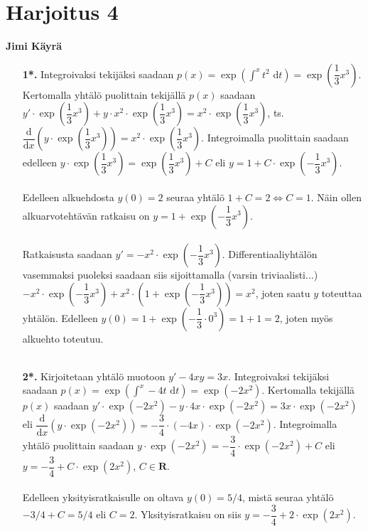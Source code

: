 \documentclass[12pt,fleqn]{article}
\begin{document}
\section*{Harjoitus 4}
\textbf{Jimi Käyrä}\\
\begin{enumerate}[label=\textbf{\arabic*.}]
\item [\textbf{1*.}] Integroivaksi tekijäksi saadaan \(p(x)=\exp \left (\int^x t^2\text{ d}t\right )=\exp \left (\dfrac{1}{3}x^3\right )\). Kertomalla yhtälö puolittain tekijällä \(p(x)\) saadaan \(y'\cdot \exp\left (\dfrac{1}{3}x^3 \right )+y\cdot x^2\cdot \exp \left (\dfrac{1}{3}x^3\right )=x^2\cdot \exp \left (\dfrac{1}{3}x^3\right )\), ts. \(\dfrac{\text{d}}{\text{d}x}\left (y\cdot \exp \left (\dfrac{1}{3}x^3\right )\right )=x^2\cdot \exp \left (\dfrac{1}{3}x^3\right )\). Integroimalla puolittain saadaan edelleen \(y\cdot \exp \left (\dfrac{1}{3}x^3\right )=\exp\left (\dfrac{1}{3}x^3\right )+C\) eli \(y=1+C\cdot \exp\left (-\dfrac{1}{3}x^3\right )\).\\
 \\
Edelleen alkuehdosta \(y(0)=2\) seuraa yhtälö \(1+C=2\iff C=1\). Näin ollen alkuarvotehtävän ratkaisu on \(y=1+\exp \left (-\dfrac{1}{3}x^3\right )\).\\
 \\
Ratkaisusta saadaan \(y'=-x^2\cdot \exp \left (-\dfrac{1}{3}x^3\right )\). Differentiaaliyhtälön vasemmaksi puoleksi saadaan siis sijoittamalla (varsin triviaalisti...) \(-x^2\cdot \exp \left (-\dfrac{1}{3}x^3\right )+x^2\cdot \left (1+\exp \left (-\dfrac{1}{3}x^3\right )\right )=x^2\), joten saatu \(y\) toteuttaa yhtälön. Edelleen \(y(0)=1+\exp \left (-\dfrac{1}{3}\cdot 0^3\right )=1+1=2\), joten myös alkuehto toteutuu.\\
 \\
\item [\textbf{2*.}]Kirjoitetaan yhtälö muotoon \(y'-4xy=3x\). Integroivaksi tekijäksi saadaan \(p(x)=\exp \left (\int^x -4t\text{ d}t\right )=\exp (-2x^2)\). Kertomalla tekijällä \(p(x)\) saadaan \(y'\cdot \exp (-2x^2)-y\cdot 4x\cdot \exp (-2x^2)=3x\cdot \exp(-2x^2)\) eli \(\dfrac{\text{d}}{\text{d}x} \left (y\cdot \exp(-2x^2)\right )=-\dfrac{3}{4}\cdot (-4x)\cdot \exp(-2x^2)\). Integroimalla yhtälö puolittain saadaan \(y\cdot \exp(-2x^2)=-\dfrac{3}{4}\cdot \exp(-2x^2)+C\) eli \(y=-\dfrac{3}{4}+C\cdot \exp(2x^2)\), \(C\in \mathbf{R}\).\\
 \\
Edelleen yksityisratkaisulle on oltava \(y(0)=5/4\), mistä seuraa yhtälö \(-3/4+C=5/4\) eli \(C=2\). Yksityisratkaisu on siis \(y=-\dfrac{3}{4}+2\cdot \exp(2x^2)\).
\end{enumerate}
\end{document}
